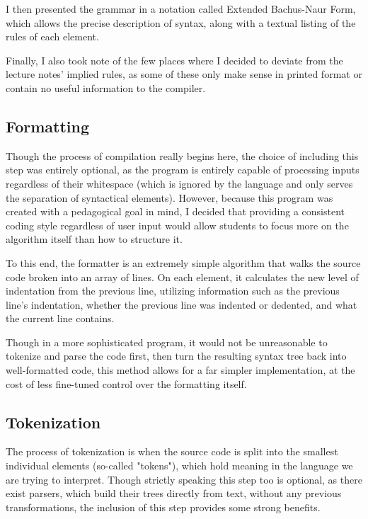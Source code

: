 \documentclass[conference]{IEEEtran}
\begin{document}
I then presented the grammar in a notation called Extended Bachus-Naur Form, which allows the precise description of syntax, along with a textual listing of the rules of each element.

Finally, I also took note of the few places where I decided to deviate from the lecture notes' implied rules, as some of these only make sense in printed format or contain no useful information to the compiler.

\subsection{Formatting}

Though the process of compilation really begins here, the choice of including this step was entirely optional, as the program is entirely capable of processing inputs regardless of their whitespace (which is ignored by the language and only serves the separation of syntactical elements). However, because this program was created with a pedagogical goal in mind, I decided that providing a consistent coding style regardless of user input would allow students to focus more on the algorithm itself than how to structure it.

To this end, the formatter is an extremely simple algorithm that walks the source code broken into an array of lines. On each element, it calculates the new level of indentation from the previous line, utilizing information such as the previous line's indentation, whether the previous line was indented or dedented, and what the current line contains.

Though in a more sophisticated program, it would not be unreasonable to tokenize and parse the code first, then turn the resulting syntax tree back into well-formatted code, this method allows for a far simpler implementation, at the cost of less fine-tuned control over the formatting itself.

\subsection{Tokenization}

The process of tokenization is when the source code is split into the smallest individual elements (so-called "tokens"), which hold meaning in the language we are trying to interpret. Though strictly speaking this step too is optional, as there exist parsers, which build their trees directly from text, without any previous transformations, the inclusion of this step provides some strong benefits.
\end{document}

